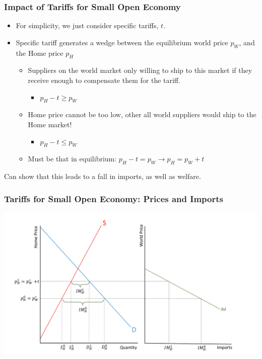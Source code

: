 \documentclass{beamer}
\begin{document}
\begin{frame}
	\frametitle{Impact of Tariffs for Small Open Economy}
	\begin{itemize}
		\item For simplicity, we just consider specific tariffs, $t$.
		\item Specific tariff generates a wedge between the equilibrium world price $p_W$, and the Home price $p_H$
			\begin{itemize}
				\item Suppliers on the world market only willing to ship to this market if they receive enough to compensate them for the tariff.
					\begin{itemize}
						\item $p_H-t \geq p_W$
					\end{itemize}
				\item Home price cannot be too low, other all world suppliers would ship to the Home market!
				\begin{itemize}
					\item $p_H-t \leq p_W$
				\end{itemize}
				\item Must be that in equilibrium: $p_H-t = p_W \rightarrow p_H = p_W + t$ 
			\end{itemize}
	\end{itemize}
	\begin{center}
		\item Can show that this leads to a fall in imports, as well as welfare.
	\end{center}
\end{frame}

\begin{frame}
	\frametitle{Tariffs for Small Open Economy: Prices and Imports}
	
	\includegraphics[scale=0.3]{SL_6.pdf}
	
\end{frame}
\end{document}
